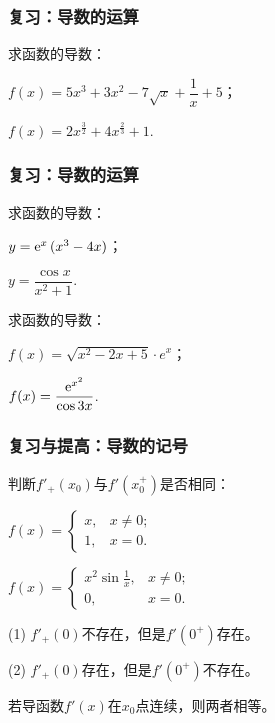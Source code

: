 \documentclass[14pt,notheorems,leqno,xcolor={rgb}]{beamer} %
\begin{document}

\begin{oframe}
\frametitle{复习：导数的运算}
\begin{review}
求函数的导数：
\begin{enumlite}
  \item $f(x)=5x^3+3x^2-7\sqrt{x}+\dfrac1x+5$；
  \pause
  \item $f(x)=2x^{\frac32}+4x^{\frac23}+1$.
\end{enumlite}
\end{review}
\end{oframe}

\begin{oframe}
\frametitle{复习：导数的运算}
\begin{review}
求函数的导数：
\begin{enumlite}
  \item $y=\mathrm{e}^x\,(x^3-4x)$；
  \item $y=\dfrac{\cos x}{x^2+1}$.
\end{enumlite}
\end{review}
\vpause
\begin{review}
求函数的导数：
\begin{enumlite}
  \item $f(x)=\sqrt{x^2-2x+5}\cdot e^x$；
  \item $f(x)=\dfrac{\mathrm{e}^{x^2}}{\cos 3x}$.
\end{enumlite}
\end{review}
\end{oframe}

\begin{iframe}
\frametitle{复习与提高：导数的记号}
\begin{example}
判断$f'_+(x_0)$与$f'(x_0^+)$是否相同：
\begin{enumlite}
  \item $f(x)=\begin{cases}x, & x\neq0; \\ 1,& x=0. \end{cases}$
  \item $f(x)=\begin{cases}x^2\sin\frac1x, & x\neq0; \\ 0,& x=0. \end{cases}$
\end{enumlite}
\end{example}
\pause
\begin{solution}
(1) $f'_+(0)$不存在，但是$f'(0^+)$存在。\par
(2) $f'_+(0)$存在，但是$f'(0^+)$不存在。
\end{solution}
\pause
\begin{remark*}
若导函数$f'(x)$在$x_0$点连续，则两者相等。
\end{remark*}
\end{iframe}
\end{document}
